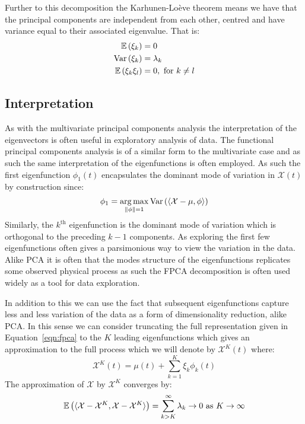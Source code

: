 Further to this decomposition the Karhunen-Lo\`{e}ve theorem means we have that the principal components are independent from each other, centred and have variance equal to their associated eigenvalue.
That is:
\begin{align}
	\operatorname{\mathbb{E}}\left(\xi_k\right) &= 0 \\
	\text{Var}\left(\xi_k\right) &= \lambda_k \\
	\operatorname{\mathbb{E}}\left(\xi_k \xi_l\right) &= 0,~\text{for}~ k \ne l \label{eqn:principal_comp_uncorr}
\end{align}

\subsection{Interpretation}
As with the multivariate principal components analysis the interpretation of the eigenvectors is often useful in exploratory analysis of data.
The functional principal components analysis is of a similar form to the multivariate case and as such the same interpretation of the eigenfunctions is often employed.
As such the first eigenfunction $\phi_1(t)$ encapsulates the dominant mode of variation in $\mathcal{X}(t)$ by construction since:
\begin{equation}\label{eqn:first_comp}
	\phi_1 = \operatorname*{arg\,max}_{\lVert \phi \rVert=1} \text{Var}\left( \langle  \mathcal{X} - \mu, \phi \rangle  \right)
\end{equation}
Similarly, the $k^\text{th}$ eigenfunction is the dominant mode of variation which is orthogonal to the preceding $k-1$ components.
As exploring the first few eigenfunctions often gives a parsimonious way to view the variation in the data.
Alike PCA it is often that the modes structure of the eigenfunctions replicates some observed physical process as such the FPCA decomposition is often used widely as a tool for data exploration. 

In addition to this we can use the fact that subsequent eigenfunctions capture less and less variation of the data as a form of dimensionality reduction, alike PCA.
In this sense we can consider truncating the full representation given in Equation~\eqref{eqn:fpca} to the $K$ leading eigenfunctions which gives an approximation to the full process which we will denote by $\mathcal{X}^K(t)$ where:
\begin{equation}\label{eqn:fpca_trun}
	\mathcal{X}^K(t)  =   \mu(t) + \sum_{k=1}^{K}\xi_k \phi_k(t)
\end{equation}
The approximation of $\mathcal{X}$ by $\mathcal{X}^K$ converges by:
\begin{equation}\label{eqn:fpca_trun_conv}
	\operatorname{\mathbb{E}} \left( \langle  \mathcal{X} - \mathcal{X}^K, \mathcal{X} - \mathcal{X}^K \rangle \right)  =   \sum_{k > K}^{\infty} \lambda_k \to 0~\text{as}~K \to \infty
\end{equation}

